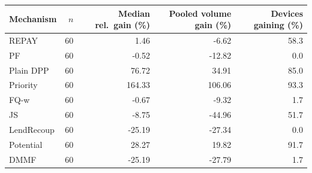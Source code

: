 \begin{tabular}{lrrrr}
\toprule
Mechanism & $n$ & Median rel.\ gain (\%) & Pooled volume gain (\%) & Devices gaining (\%) \\
\midrule
REPAY & 60 & 1.46 & -6.62 & 58.3 \\
PF & 60 & -0.52 & -12.82 & 0.0 \\
Plain DPP & 60 & 76.72 & 34.91 & 85.0 \\
Priority & 60 & 164.33 & 106.06 & 93.3 \\
\midrule
FQ-w & 60 & -0.67 & -9.32 & 1.7 \\
JS & 60 & -8.75 & -44.96 & 51.7 \\
LendRecoup & 60 & -25.19 & -27.34 & 0.0 \\
Potential & 60 & 28.27 & 19.82 & 91.7 \\
DMMF & 60 & -25.19 & -27.79 & 1.7 \\
\bottomrule
\end{tabular}
